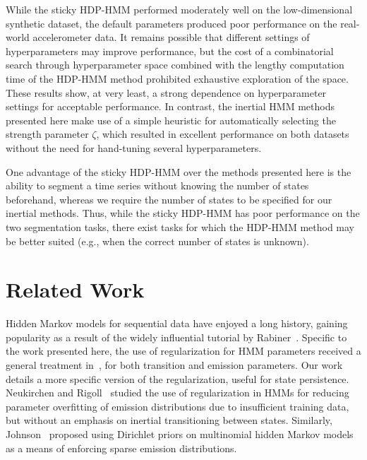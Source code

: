 \documentclass[letterpaper]{article}
\begin{document}
While the sticky HDP-HMM performed moderately well on the low-dimensional synthetic dataset, the default parameters produced poor performance on the real-world accelerometer data. It remains possible that different settings of hyperparameters may improve performance, but the cost of a combinatorial search through hyperparameter space combined with the lengthy computation time of the HDP-HMM method prohibited exhaustive exploration of the space. These results show, at very least, a strong dependence on hyperparameter settings for acceptable performance. In contrast, the inertial HMM methods presented here make use of a simple heuristic for automatically selecting the strength parameter $\zeta$, which resulted in excellent performance on both datasets without the need for hand-tuning several hyperparameters. 

One advantage of the sticky HDP-HMM over the methods presented here is the ability to segment a time series without knowing the number of states beforehand, whereas we require the number of states to be specified for our inertial methods. Thus, while the sticky HDP-HMM has poor performance on the two segmentation tasks, there exist tasks for which the HDP-HMM method may be better suited (e.g., when the correct number of states is unknown).

\section{Related Work}

Hidden Markov models for sequential data have enjoyed a long history, gaining popularity as a result of the widely influential tutorial by Rabiner~\cite{rabiner1989tutorial}. Specific to the work presented here, the use of regularization for HMM parameters received a general treatment in~\cite{MAP1994}, for both transition and emission parameters. Our work details a more specific version of the regularization, useful for state persistence. Neukirchen and Rigoll~\cite{neukirchen1999controlling} studied the use of regularization in HMMs for reducing parameter overfitting of emission distributions due to insufficient training data, but without an emphasis on inertial transitioning between states. Similarly, Johnson~\cite{Johnson07whydoesnt} proposed using Dirichlet priors on multinomial hidden Markov models as a means of enforcing sparse emission distributions. 
\end{document}
